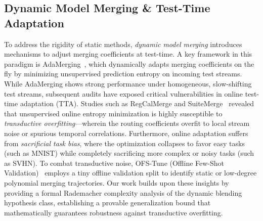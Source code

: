 \subsection{Dynamic Model Merging \& Test-Time Adaptation}
To address the rigidity of static methods, \emph{dynamic model merging} introduces mechanisms to adjust merging coefficients at test-time. 
A key framework in this paradigm is AdaMerging~\cite{lu2023adamerging}, which dynamically adapts merging coefficients on the fly by minimizing unsupervised prediction entropy on incoming test streams. 
While AdaMerging shows strong performance under homogeneous, slow-shifting test streams, subsequent audits have exposed critical vulnerabilities in online test-time adaptation (TTA). 
Studies such as RegCalMerge and SuiteMerge~\cite{regcalmerge, suitemerge} revealed that unsupervised online entropy minimization is highly susceptible to \emph{transductive overfitting}---wherein the routing coefficients overfit to local stream noise or spurious temporal correlations. 
Furthermore, online adaptation suffers from \emph{sacrificial task bias}, where the optimization collapses to favor easy tasks (such as MNIST) while completely sacrificing more complex or noisy tasks (such as SVHN). 
To combat transductive noise, OFS-Tune (Offline Few-Shot Validation)~\cite{OFS2025} employs a tiny offline validation split to identify static or low-degree polynomial merging trajectories. 
Our work builds upon these insights by providing a formal Rademacher complexity analysis of the dynamic blending hypothesis class, establishing a provable generalization bound that mathematically guarantees robustness against transductive overfitting.

